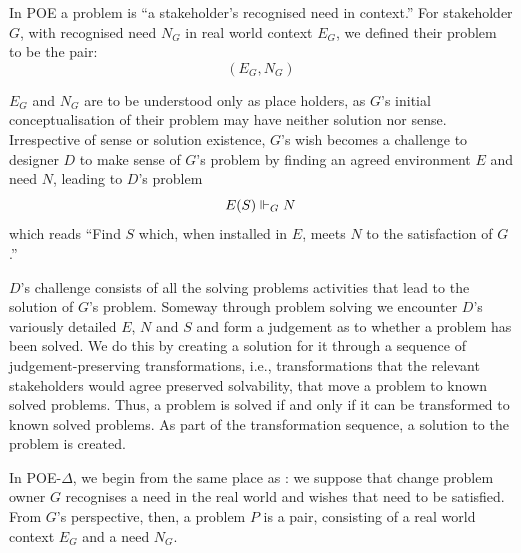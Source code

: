 \documentclass[runningheads,a4paper]{llncs}
\begin{document}
In POE a problem is ``a stakeholder's recognised need in context.''
For stakeholder $G$, with recognised need $N_G$ in real world context
$E_G$, we defined their problem to be the pair:
%
\[(E_G,N_G)\]
%

$E_G$ and $N_G$ are to be understood only as place holders, as $G$'s
initial conceptualisation of their problem may have neither solution
nor sense. Irrespective of sense or solution existence, $G$'s wish
becomes a challenge to designer $D$ to make sense of $G$'s problem by
finding an agreed environment $E$ and need $N$, leading to $D$'s
problem
%
\[E(S)\Vdash_{G}N\]
%
which reads ``Find $S$ which, when installed in $E$, meets $N$ to the
satisfaction of $G$.''

$D$'s challenge consists of all the solving problems activities that
lead to the solution of $G$'s problem. Someway through problem solving
we encounter $D$'s variously detailed $E$, $N$ and $S$ and form a
judgement as to whether a problem has been solved. We do this by
creating a solution for it through a sequence of judgement-preserving
transformations, i.e., transformations that the relevant stakeholders
would agree preserved solvability, that move a problem to known solved
problems. Thus, a problem is solved if and only if it can be
transformed to known solved problems. As part of the transformation
sequence, a solution to the problem is created.

In POE-$\Delta$, we begin from the same place as \POE{}: we suppose
that change problem owner $G$ recognises a need in the real world and
wishes that need to be satisfied. From $G$'s perspective, then, a
problem $P$ is a pair, consisting of a real world context $E_G$ and a
need $N_G$.
\end{document}
